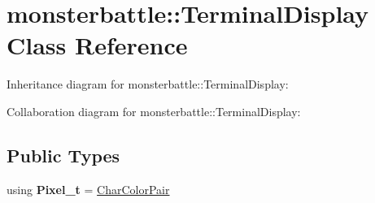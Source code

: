 \hypertarget{classmonsterbattle_1_1TerminalDisplay}{}\section{monsterbattle\+:\+:Terminal\+Display Class Reference}
\label{classmonsterbattle_1_1TerminalDisplay}


Inheritance diagram for monsterbattle\+:\+:Terminal\+Display\+:


Collaboration diagram for monsterbattle\+:\+:Terminal\+Display\+:
\subsection*{Public Types}
\begin{DoxyCompactItemize}
\item 
\mbox{\label{classmonsterbattle_1_1TerminalDisplay_a8efdca3f4b43d832fc90ebbbfd916a46}} 
using {\bfseries Pixel\+\_\+t} = \hyperlink{structmonsterbattle_1_1CharColorPair}{Char\+Color\+Pair}
\end{DoxyCompactItemize}
